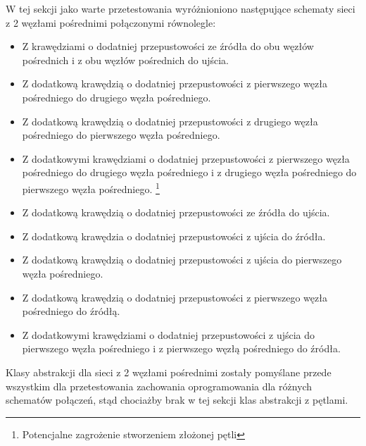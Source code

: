 \documentclass[10pt]{dokument-tiwo}
\begin{document}
W tej sekcji jako warte przetestowania wyróżnioniono następujące schematy sieci z 2 węzłami pośrednimi połączonymi równolegle:
\begin{itemize}
    \item Z krawędziami o dodatniej przepustowości ze źródła do obu węzłów pośrednich i z obu węzłów pośrednich do ujścia.
    \item Z dodatkową krawędzią o dodatniej przepustowości z pierwszego węzła pośredniego do drugiego węzła pośredniego.
    \item Z dodatkową krawędzią o dodatniej przepustowości z drugiego węzła pośredniego do pierwszego węzła pośredniego.
    \item Z dodatkowymi krawędziami o dodatniej przepustowości z pierwszego węzła pośredniego do drugiego węzła pośredniego i z drugiego węzła pośredniego do pierwszego węzła pośredniego.
\footnote{Potencjalne zagrożenie stworzeniem złożonej pętli}
    \item Z dodatkową krawędzią o dodatniej przepustowości ze źródła do ujścia.
    \item Z dodatkową krawędzia o dodatniej przepustowości z ujścia do źródła.
    \item Z dodatkową krawędzią o dodatniej przepustowości z ujścia do pierwszego węzła pośredniego.
    \item Z dodatkową krawędzią o dodatniej przepustowości z pierwszego węzła pośredniego do źródłą.
    \item Z dodatkowymi krawędziami o dodatniej przepustowości z ujścia do pierwszego węzła pośredniego i z pierwszego węzłą pośredniego do źródła.
\end{itemize}
Klasy abstrakcji dla sieci z 2 węzłami pośrednimi zostały pomyślane przede wszystkim dla przetestowania zachowania oprogramowania dla różnych schematów połączeń, stąd chociażby brak w tej sekcji klas abstrakcji z pętlami.
\end{document}
